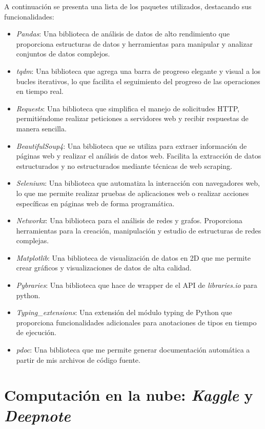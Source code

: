 A continuación se presenta una lista de los paquetes utilizados, destacando sus funcionalidades:

\begin{itemize}
  \item \textit{Pandas}: Una biblioteca de análisis de datos de alto rendimiento que proporciona 
  estructuras de datos y herramientas para manipular y analizar conjuntos de datos complejos.
  \item \textit{tqdm}: Una biblioteca que agrega una barra de progreso elegante y visual a los 
  bucles iterativos, lo que facilita el seguimiento del progreso de las operaciones en tiempo real.
  \item \textit{Requests}: Una biblioteca que simplifica el manejo de solicitudes HTTP, 
  permitiéndome realizar peticiones a servidores web y recibir respuestas de manera sencilla.
  \item \textit{BeautifulSoup4}: Una biblioteca que se utiliza para extraer información de páginas web 
  y realizar el análisis de datos web. Facilita la extracción de datos estructurados y no estructurados 
  mediante técnicas de web scraping.
  \item \textit{Selenium}: Una biblioteca que automatiza la interacción con navegadores web, lo que 
  me permite realizar pruebas de aplicaciones web o realizar acciones específicas en páginas web de 
  forma programática.
  \item \textit{Networkx}: Una biblioteca para el análisis de redes y grafos. Proporciona herramientas 
  para la creación, manipulación y estudio de estructuras de redes complejas.
  \item \textit{Matplotlib}: Una biblioteca de visualización de datos en 2D que me permite crear 
  gráficos y visualizaciones de datos de alta calidad.
  \item \textit{Pybraries}: Una biblioteca que hace de wrapper de el API de 
  \textit{libraries.io} para python.
  \item \textit{Typing\_extensions}: Una extensión del módulo typing de Python que proporciona 
  funcionalidades adicionales para anotaciones de tipos en tiempo de ejecución.
  \item \textit{pdoc}: Una biblioteca que me permite generar documentación automática a partir 
  de mis archivos de código fuente.
\end{itemize}

\section{Computación en la nube: \textit{Kaggle} y \textit{Deepnote}}


